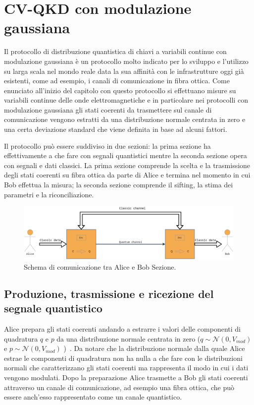 \section{CV-QKD con modulazione gaussiana}
Il protocollo di distribuzione quantistica di chiavi a variabili continue con modulazione gaussiana \`e un protocollo molto indicato per lo sviluppo e l'utilizzo su larga scala nel mondo reale data la sua affinit\`a con le infrastrutture oggi gi\`a esistenti, come ad esempio, i canali di comunicazione in fibra ottica. Come enunciato all'inizio del capitolo con questo protocollo si effettuano misure su variabili continue delle onde elettromagnetiche e in particolare nei protocolli con modulazione gaussiana gli stati coerenti da trasmettere sul canale di comunicazione vengono estratti da una distribuzione normale centrata in zero e una certa deviazione standard che viene definita in base ad alcuni fattori.

Il protocollo pu\`o essere suddiviso in due sezioni: la prima sezione ha effettivamente a che fare con segnali quantistici mentre la seconda sezione opera con segnali e dati classici. La prima sezione comprende la scelta e la trasmissione degli stati coerenti su fibra ottica da parte di Alice e termina nel momento in cui Bob effettua la misura; la seconda sezione comprende il sifting, la stima dei parametri e la riconciliazione.

\begin{figure}[H] 
\begin{center}
\includegraphics[width=\textwidth]{figure/alice_bob_communication.eps} 
\end{center}
\caption{Schema di comunicazione tra Alice e Bob Sezione.} \label{fig:alice-bob-schema}
\end{figure}

\subsection{Produzione, trasmissione e ricezione del segnale quantistico}\label{subse:sottosezione2-1-1}
Alice prepara gli stati coerenti andando a estrarre i valori delle componenti di quadratura $q$ e $p$ da una distribuzione normale centrata in zero ($q \sim {\mathcal N(0, V_{mod})}$ e $p \sim {\mathcal N(0, V_{mod})}$ )~\cite{https://doi.org/10.1002/qute.201800011}. Da notare che la distribuzione normale dalla quale Alice estrae le componenti di quadratura non ha nulla a che fare con le distribuzioni normali che caratterizzano gli stati coerenti ma rappresenta il modo in cui i dati vengono modulati. Dopo la preparazione Alice trasmette a Bob gli stati coerenti attraverso un canale di comunicazione, ad esempio una fibra ottica, che può essere anch'esso rappresentato come un canale quantistico.

